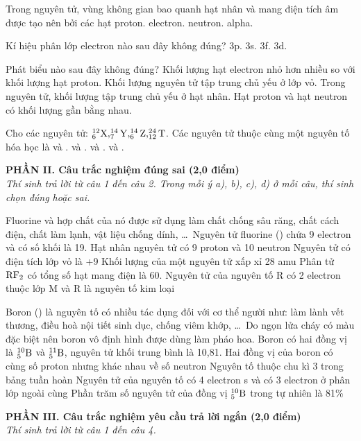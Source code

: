 \documentclass[11pt,a4paper]{article}
\begin{document}
\begin{ex}
Trong nguyên tử, vùng không gian bao quanh hạt nhân và mang điện tích âm được tạo nên bởi các hạt
\choice
{proton.}
{electron.}
{neutron.}
{alpha.}
\end{ex}
\begin{ex}
Kí hiệu phân lớp electron nào sau đây không đúng?
\choice
{3p.}
{3s.}
{3f.}
{3d.}
\end{ex}
\begin{ex}
Phát biểu nào sau đây không đúng?
\choice
{Khối lượng hạt electron nhỏ hơn nhiều so với khối lượng hạt proton.}
{Khối lượng nguyên tử tập trung chủ yếu ở lớp vỏ.}
{Trong nguyên tử, khối lượng tập trung chủ yếu ở hạt nhân.}
{Hạt proton và hạt neutron có khối lượng gần bằng nhau.}
\end{ex}
\begin{ex}
Cho các nguyên tử: $^{12}_6\ce{X}, ^{14}_7\ce{Y}, ^{14}_6\ce{Z}, ^{24}_{12}\ce{T}$. Các nguyên tử thuộc cùng một nguyên tố hóa học là
\choice
{ và .}
{ và .}
{ và .}
{ và .}
\end{ex}
\vspace{4pt}
\noindent
{\color{mainGreen}\textbf{\large PHẦN II. Câu trắc nghiệm đúng sai (2,0 điểm)}}\\
\textit{\small Thí sinh trả lời từ câu 1 đến câu 2. Trong mỗi ý a), b), c), d) ở mỗi câu, thí sinh chọn đúng hoặc sai.}
\vspace{2pt}

\begin{ex}
Fluorine và hợp chất của nó được sử dụng làm chất chống sâu răng, chất cách điện, chất làm lạnh, vật liệu chống dính, \dots\ Nguyên tử fluorine () chứa 9 electron và có số khối là 19.
\choiceTF
{Hạt nhân nguyên tử  có 9 proton và 10 neutron}
{Nguyên tử  có điện tích lớp vỏ là +9}
{Khối lượng của một nguyên tử  xấp xỉ 28 amu}
{Phân tử $\ce{RF2}$ có tổng số hạt mang điện là 60. Nguyên tử của nguyên tố R có 2 electron thuộc lớp M và R là nguyên tố kim loại}
\end{ex}
\begin{ex}
Boron () là nguyên tố có nhiều tác dụng đối với cơ thể người như: làm lành vết thương, điều hoà nội tiết sinh dục, chống viêm khớp, \dots\ Do ngọn lửa cháy có màu đặc biệt nên boron vô định hình được dùng làm pháo hoa. Boron có hai đồng vị là $^{10}_5\ce{B}$ và $^{11}_5\ce{B}$, nguyên tử khối trung bình là 10,81.
\choiceTF
{Hai đồng vị của boron có cùng số proton nhưng khác nhau về số neutron}
{Nguyên tố  thuộc chu kì 3 trong bảng tuần hoàn}
{Nguyên tử của nguyên tố  có 4 electron s và có 3 electron ở phân lớp ngoài cùng}
{Phần trăm số nguyên tử của đồng vị $^{10}_5\ce{B}$ trong tự nhiên là 81\%}
\end{ex}
\vspace{4pt}
\noindent
{\color{mainGreen}\textbf{\large PHẦN III. Câu trắc nghiệm yêu cầu trả lời ngắn (2,0 điểm)}}\\
\textit{\small Thí sinh trả lời từ câu 1 đến câu 4.}
\vspace{2pt}
\end{document}
